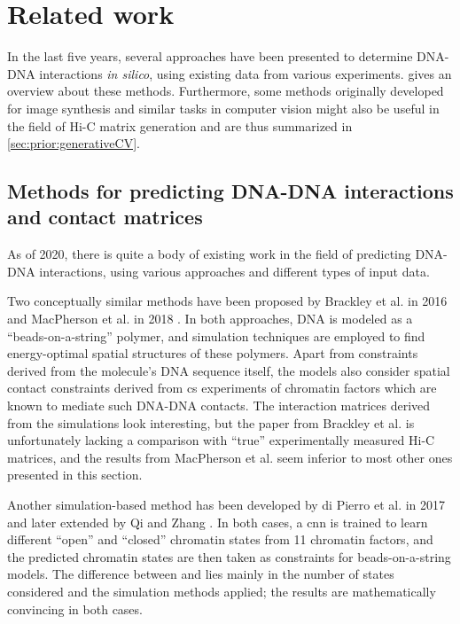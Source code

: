 \section{Related work}
In the last five years, several approaches have been presented to determine DNA-DNA interactions \emph{in silico}, 
using existing data from various experiments.  gives an overview about these methods.
Furthermore, some methods originally developed for image synthesis and similar tasks in computer vision might also be useful 
in the field of Hi-C matrix generation and are thus summarized in \autoref{sec:prior:generativeCV}.

\subsection{Methods for predicting DNA-DNA interactions and contact matrices} \label{sec:prior:predictingInteractions}
As of 2020, there is quite a body of existing work in the field of predicting DNA-DNA interactions, 
using various approaches and different types of input data.

Two conceptually similar methods have been proposed by Brackley et al. in 2016 and MacPherson et al. in 2018 \cite{Brackley2016, MacPherson2018}.
In both approaches, DNA is modeled as a ``beads-on-a-string'' polymer, and simulation techniques are employed to
find energy-optimal spatial structures of these polymers.
Apart from constraints derived from the molecule's DNA sequence itself, the models also consider spatial contact constraints derived from \acrshort{cs} experiments
of chromatin factors which are known to mediate such DNA-DNA contacts.
The interaction matrices derived from the simulations look interesting, 
but the paper from Brackley et al. \cite{Brackley2016} is unfortunately lacking a comparison with ``true'' experimentally measured Hi-C matrices, 
and the results from MacPherson et al. \cite{MacPherson2018} seem inferior to most other ones presented in this section.

Another simulation-based method has been developed by di Pierro et al. in 2017 \cite{Pierro2017} and later extended by Qi and Zhang \cite{Qi2019}. 
In both cases, a \acrfull{cnn} is trained to learn different ``open'' and ``closed'' chromatin states from 11 chromatin factors, 
and the predicted chromatin states are then taken as constraints for beads-on-a-string models.
The difference between \cite{Pierro2017} and \cite{Qi2019} lies mainly in the number of states considered and the simulation methods applied;
the results are mathematically convincing in both cases.

